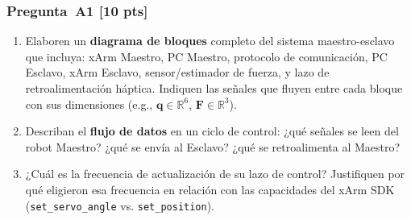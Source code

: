 \documentclass[journal,10pt,twoside]{IEEEtran}
\newcommand{\pts}[1]{\textcolor{tec_red}{\textbf{[#1 pts]}}}
\begin{document}
\subsubsection*{Pregunta~A1 \pts{10}}
\begin{enumerate}[label=(\alph*)]
  \item Elaboren un \textbf{diagrama de bloques} completo del sistema
        maestro-esclavo que incluya: xArm Maestro, PC Maestro,
        protocolo de comunicación, PC Esclavo, xArm Esclavo,
        sensor/estimador de fuerza, y lazo de retroalimentación háptica.
        Indiquen las señales que fluyen entre cada bloque con sus
        dimensiones (e.g., $\bm{q}\in\mathbb{R}^6$, $\bm{F}\in\mathbb{R}^3$).
  \item Describan el \textbf{flujo de datos} en un ciclo de control:
        ¿qué señales se leen del robot Maestro? ¿qué se envía al Esclavo?
        ¿qué se retroalimenta al Maestro?
  \item ¿Cuál es la frecuencia de actualización de su lazo de control?
        Justifiquen por qué eligieron esa frecuencia en relación con
        las capacidades del xArm SDK (\texttt{set\_servo\_angle} vs.
        \texttt{set\_position}).
\end{enumerate}
\end{document}
